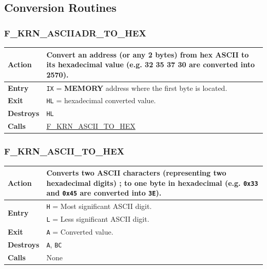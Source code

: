 \documentclass[a4paper,11pt]{article}
\begin{document}
    \subsection{Conversion Routines}

        \subsubsection{F\_KRN\_ASCIIADR\_TO\_HEX}
        \label{func:fkrnasciiadrtohex}
        \begin{tabular}{l p{9cm}}
            \hline\textbf{Action}
            & Convert an address (or any 2 bytes) from hex ASCII to its 
            hexadecimal value (e.g. 32 35 37 30 are converted into 2570).\\
            \hline\textbf{Entry} & \texttt{IX} = \textbf{MEMORY} address where
            the first byte is located.\\
            \hline\textbf{Exit} & \texttt{HL} = hexadecimal converted value.\\
            \hline\textbf{Destroys} & \texttt{HL}\\
            \hline\textbf{Calls}
            & \hyperref[func:fkrnasciitohex]{F\_KRN\_ASCII\_TO\_HEX}\\
            \hline
        \end{tabular}

        \subsubsection{F\_KRN\_ASCII\_TO\_HEX}
        \label{func:fkrnasciitohex}
        \begin{tabular}{l p{9cm}}
            \hline\textbf{Action}
            & Converts two ASCII characters (representing two hexadecimal digits)
            ; to one byte in hexadecimal (e.g. \texttt{0x33} and \texttt{0x45}
            are converted into \texttt{3E}).\\
            \hline\multirow[t]{2}{4em}{\textbf{Entry}}
            & \texttt{H} = Most significant ASCII digit.\\
            & \texttt{L} = Less significant ASCII digit.\\
            \hline\textbf{Exit} & \texttt{A} = Converted value.\\
            \hline\textbf{Destroys} & \texttt{A}, \texttt{BC}\\
            \hline\textbf{Calls} & None\\
            \hline
        \end{tabular}
\end{document}
